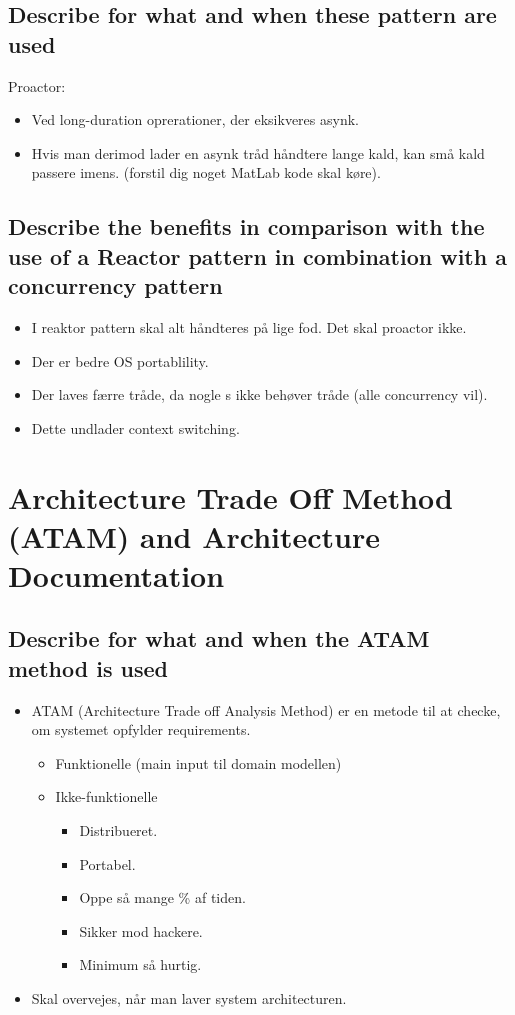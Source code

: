 \documentclass{article}
\begin{document}
\subsection{Describe for what and when these pattern are used}

Proactor:
\vspace{-10pt}
\begin{itemize}
	\item Ved long-duration oprerationer, der eksikveres asynk.
	\item Hvis man derimod lader en asynk tråd håndtere lange kald, kan små kald passere imens. (forstil dig noget MatLab kode skal køre).
\end{itemize}


\subsection{Describe the benefits in comparison with the use of a Reactor pattern in combination with a concurrency pattern}


\begin{itemize}
	\item I reaktor pattern skal alt håndteres på lige fod. Det skal proactor ikke.
	\item Der er bedre OS portablility.
	\item Der laves færre tråde, da nogle s ikke behøver tråde (alle concurrency vil).
	\item Dette undlader context switching.
\end{itemize}






\newpage
\section{Architecture Trade Off Method (ATAM) and Architecture Documentation}

\subsection{Describe for what and when the ATAM method is used}
\begin{itemize}
	\item ATAM (Architecture Trade off Analysis Method) er en metode til at checke, om systemet opfylder requirements.
	\begin{itemize}
		\item Funktionelle (main input til domain modellen)
		\item Ikke-funktionelle 
		\begin{itemize}
			\item Distribueret.
			\item Portabel.
			\item Oppe så mange \% af tiden.
			\item Sikker mod hackere.
			\item Minimum så hurtig.
		\end{itemize}
	\end{itemize}
	\item Skal overvejes, når man laver system architecturen.
\end{itemize}
\end{document}
